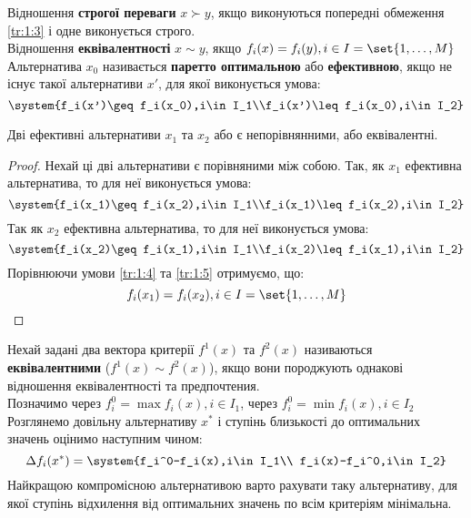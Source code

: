 Відношення {\bf строгої переваги} $x\succ y$, якщо виконуються попередні обмеження \eqref{tr:1:3}
і одне виконується строго.\\
Відношення {\bf еквівалентності} $x\sim y$, якщо $f_i(x)=f_i(y),i\in I=\set{1,\ldots,M}$\\
Альтернатива $x_0$ називається {\bf паретто оптимальною} або {\bf ефективною}, якщо не існує такої альтернативи $x'$, для якої виконується умова:
\begin{equation}
\system{f_i(x')\geq f_i(x_0),i\in I_1\\f_i(x')\leq f_i(x_0),i\in I_2}
\end{equation}
\begin{teor}
Дві ефективні альтернативи $x_1$ та $x_2$ або є непорівнянними, або еквівалентні.
\end{teor}
\begin{proof}
Нехай ці дві альтернативи є порівняними між собою. Так, як $x_1$ ефективна альтернатива, то для неї виконується умова:
\begin{equation}\label{tr:1:4}
\system{f_i(x_1)\geq f_i(x_2),i\in I_1\\f_i(x_1)\leq f_i(x_2),i\in I_2}
\end{equation}
Так як $x_2$ ефективна альтернатива, то для неї виконується умова:
\begin{equation}\label{tr:1:5}
\system{f_i(x_2)\geq f_i(x_1),i\in I_1\\f_i(x_2)\leq f_i(x_1),i\in I_2}
\end{equation}
Порівнюючи умови \eqref{tr:1:4} та \eqref{tr:1:5} отримуємо, що:
\begin{equation}
f_i(x_1)=f_i(x_2),i\in I=\set{1,\ldots,M}
\end{equation}
\end{proof}
Нехай задані два вектора критерії $f^1(x)$ та $f^2(x)$ називаються {\bf еквівалентними} ($f^1(x)\sim f^2(x)$), якщо вони породжують однакові відношення еквівалентності та предпочтения.\\
Позначимо через $f^0_i = \max f_i(x),i\in I_1$, через $f^0_i = \min f_i(x),i\in I_2$\\
Розглянемо довільну альтернативу $x^*$ і ступінь близькості до оптимальних значень оцінимо наступним чином:
\begin{equation}
\Delta f_i(x^*)=\system{f_i^0-f_i(x),i\in I_1\\ f_i(x)-f_i^0,i\in I_2}
\end{equation}
Найкращою компромісною альтернативою варто рахувати таку альтернативу, для якої ступінь відхилення від оптимальних значень по всім критеріям мінімальна.\\
